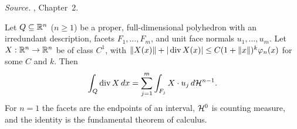 \emph{Source.} , Chapter~2.

\begin{fact}\label{tb:divergence}
Let \(Q\subseteq\mathbb R^n\) (\(n\ge1\)) be a proper, full-dimensional polyhedron
with an irredundant description, facets \(F_1,\ldots,F_m\), and unit
face normals \(u_1,\ldots,u_m\). Let \(X:\mathbb R^n\to\mathbb R^n\) be of class \(C^1\), with
\(\left\lVert X(x)\right\rVert+|\operatorname{div}X(x)|\le C(1+\left\lVert x\right\rVert)^k\varphi_n(x)\) for
some \(C\) and \(k\). Then
\[
 \int_Q\operatorname{div}X\,dx=\sum_{j=1}^m\int_{F_j}X\cdot u_j\,d\mathcal H^{n-1}.
\]
For \(n=1\) the facets are the endpoints of an interval, \(\mathcal H^0\) is
counting measure, and the identity is the fundamental theorem of calculus.
\end{fact}

